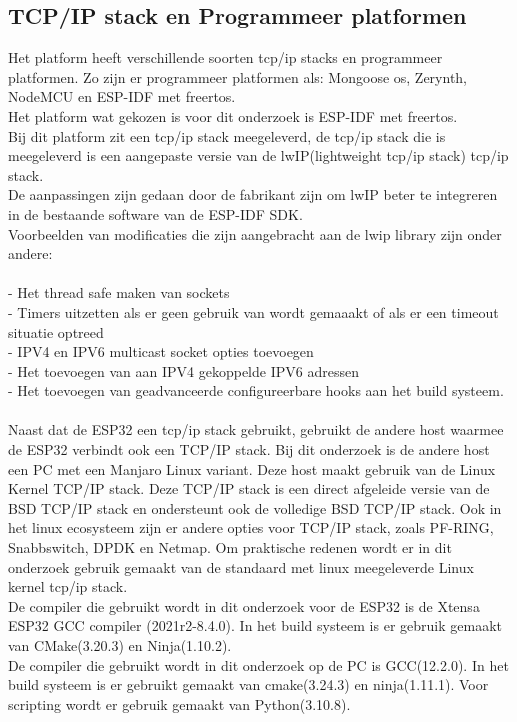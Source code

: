 \documentclass[../DCM2_Verslag.tex]{subfiles}
\begin{document}
\subsection{TCP/IP stack en Programmeer platformen}
Het platform heeft verschillende soorten tcp/ip stacks en programmeer platformen. Zo zijn er programmeer platformen als: Mongoose os, Zerynth, NodeMCU en ESP-IDF met freertos.\\ Het platform wat gekozen is voor dit onderzoek is ESP-IDF met freertos. 
\\Bij dit platform zit een tcp/ip stack meegeleverd, de tcp/ip stack die is meegeleverd is een aangepaste versie van de lwIP(lightweight tcp/ip stack) tcp/ip stack. 
\\De aanpassingen zijn gedaan door de fabrikant zijn om lwIP beter te integreren in de bestaande software van de ESP-IDF SDK. 
\\Voorbeelden van modificaties die zijn aangebracht aan de lwip library zijn onder andere: \\\\
- Het thread safe maken van sockets\\
- Timers uitzetten als er geen gebruik van wordt gemaaakt of als er een timeout situatie optreed\\
- IPV4 en IPV6 multicast socket opties toevoegen\\
- Het toevoegen van aan IPV4 gekoppelde IPV6 adressen\\
- Het toevoegen van geadvanceerde configureerbare hooks aan het build systeem.\\\\
Naast dat de ESP32 een tcp/ip stack gebruikt, gebruikt de andere host waarmee de ESP32 verbindt ook een TCP/IP stack. Bij dit onderzoek is de andere host een PC met een Manjaro Linux variant. Deze host maakt gebruik van de Linux Kernel TCP/IP stack. Deze TCP/IP stack is een direct afgeleide versie van de BSD TCP/IP stack en ondersteunt ook de volledige BSD TCP/IP stack. Ook in het linux ecosysteem zijn er andere opties voor TCP/IP stack, zoals PF-RING, Snabbswitch, DPDK en Netmap. Om praktische redenen wordt er in dit onderzoek gebruik gemaakt van de standaard met linux meegeleverde Linux kernel tcp/ip stack. \\
De compiler die gebruikt wordt in dit onderzoek voor de ESP32 is de Xtensa ESP32 GCC compiler (2021r2-8.4.0). In het build systeem is er gebruik gemaakt van CMake(3.20.3) en Ninja(1.10.2).\\
De compiler die gebruikt wordt in dit onderzoek op de PC is GCC(12.2.0). In het build systeem is er gebruikt gemaakt van cmake(3.24.3) en ninja(1.11.1). Voor scripting wordt er gebruik gemaakt van Python(3.10.8).\\
\end{document}
